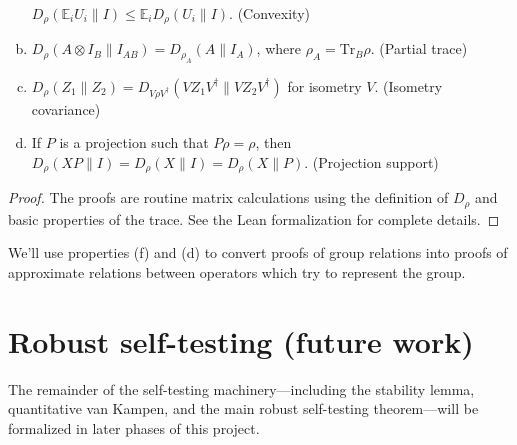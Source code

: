 \begin{lemma}
\begin{enumerate}[(a)]
		$D_\rho(\mathbb{E}_i U_i \| I) \leq \mathbb{E}_i D_\rho(U_i \| I)$. (Convexity)
		\item \label{item:state-dependent-distance-partial-trace}
		$D_\rho(A\otimes I_B \| I_{AB}) = D_{\rho_A}(A \| I_A)$, where $\rho_A = \mathrm{Tr}_B \rho$. (Partial trace)
		\item \label{item:state-dependent-distance-isometry}
		$D_\rho(Z_1 \| Z_2) = D_{V\rho V^\dagger}(VZ_1V^\dagger \| VZ_2V^\dagger)$ for isometry $V$. (Isometry covariance)
		\item\label{item:state-dependent-distance-projection-is-identity}
		If $P$ is a projection such that $P\rho = \rho$, then $D_\rho(XP \| I) = D_\rho(X \| I) = D_\rho(X \| P)$. (Projection support)
	\end{enumerate}
\end{lemma}

\begin{proof}
The proofs are routine matrix calculations using the definition of $D_\rho$ and basic properties of the trace. See the Lean formalization for complete details.
\end{proof}

We'll use properties (f) and (d) to convert proofs of group relations into proofs of approximate relations between operators which try to represent the group.

\section{Robust self-testing (future work)}

The remainder of the self-testing machinery---including the stability lemma, quantitative van Kampen, and the main robust self-testing theorem---will be formalized in later phases of this project.
